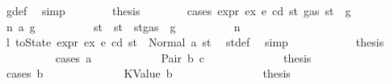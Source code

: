 \begin{isabellebody}
\ g{\isacharunderscore}{\kern0pt}def\ \isamarkupfalse%
\ simp\isanewline
\ \ \ \ \ \ \isamarkupfalse%
\ {\isacharquery}{\kern0pt}thesis\isanewline
\ \ \ \ \ \ \isamarkupfalse%
\ {\isacharparenleft}{\kern0pt}cases\ {\isachardoublequoteopen}expr\ ex\ e\ cd\ st{\isacharprime}{\kern0pt}\ {\isacharparenleft}{\kern0pt}gas\ st\ {\isacharminus}{\kern0pt}\ g{\isacharparenright}{\kern0pt}{\isachardoublequoteclose}{\isacharparenright}{\kern0pt}\isanewline
\ \ \ \ \ \ \ \ \isamarkupfalse%
\ {\isacharparenleft}{\kern0pt}n\ a\ g{\isacharprime}{\kern0pt}{\isacharparenright}{\kern0pt}\isanewline
\ \ \ \ \ \ \ \ \isamarkupfalse%
\ st{\isacharprime}{\kern0pt}{\isacharprime}{\kern0pt}\ \ {\isachardoublequoteopen}st{\isacharprime}{\kern0pt}{\isacharprime}{\kern0pt}\ {\isacharequal}{\kern0pt}\ st{\isacharprime}{\kern0pt}{\isasymlparr}gas\ {\isacharcolon}{\kern0pt}{\isacharequal}{\kern0pt}\ g{\isacharprime}{\kern0pt}{\isasymrparr}{\isachardoublequoteclose}\isanewline
\ \ \ \ \ \ \ \ \isamarkupfalse%
\ n\ \isamarkupfalse%
\ l{}{\isacharcolon}{\kern0pt}\ {\isachardoublequoteopen}toState\ {\isacharparenleft}{\kern0pt}expr\ ex\ e\ cd{\isacharparenright}{\kern0pt}\ st{\isacharprime}{\kern0pt}\ {\isacharequal}{\kern0pt}\ Normal\ {\isacharparenleft}{\kern0pt}a{\isacharcomma}{\kern0pt}\ st{\isacharprime}{\kern0pt}{\isacharprime}{\kern0pt}{\isacharparenright}{\kern0pt}{\isachardoublequoteclose}\ \isamarkupfalse%
\ st{\isacharprime}{\kern0pt}{\isacharunderscore}{\kern0pt}def\ \isamarkupfalse%
\ simp\isanewline
\ \ \ \ \ \ \ \ \isamarkupfalse%
\ \isamarkupfalse%
\ {\isacharquery}{\kern0pt}thesis\isanewline
\ \ \ \ \ \ \ \ \isamarkupfalse%
\ {\isacharparenleft}{\kern0pt}cases\ a{\isacharparenright}{\kern0pt}\isanewline
\ \ \ \ \ \ \ \ \ \ \isamarkupfalse%
\ {\isacharparenleft}{\kern0pt}Pair\ b\ c{\isacharparenright}{\kern0pt}\isanewline
\ \ \ \ \ \ \ \ \ \ \isamarkupfalse%
\ \isamarkupfalse%
\ {\isacharquery}{\kern0pt}thesis\isanewline
\ \ \ \ \ \ \ \ \ \ \isamarkupfalse%
\ {\isacharparenleft}{\kern0pt}cases\ b{\isacharparenright}{\kern0pt}\isanewline
\ \ \ \ \ \ \ \ \ \ \ \ \isamarkupfalse%
\ {\isacharparenleft}{\kern0pt}KValue\ b{\isacharparenright}{\kern0pt}\isanewline
\ \ \ \ \ \ \ \ \ \ \ \ \isamarkupfalse%
\ \isamarkupfalse%
\ {\isacharquery}{\kern0pt}thesis\isanewline

\end{isabellebody}
